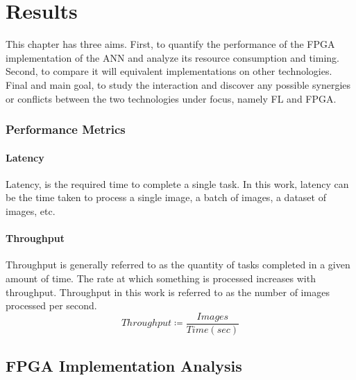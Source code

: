 \chapter{Results}
\label{Chapter-Results}
This chapter has three aims. First, to quantify the performance of the FPGA implementation of the ANN and analyze its resource consumption and timing. Second, to compare it will equivalent implementations on other technologies. Final and main goal, to study the interaction and discover any possible synergies or conflicts between the two technologies under focus, namely FL and FPGA. %

\subsection{Performance Metrics}

\subsubsection{Latency}
Latency, is the required time to complete a single task. In this work, latency can be the time taken to process a single image, a batch of images, a dataset of images, etc. %

\subsubsection{Throughput}
Throughput is generally referred to as the quantity of tasks completed in a given amount of time. The rate at which something is processed increases with throughput. Throughput in this work is referred to as the number of images processed per second. %
\begin{equation}
	Throughput \coloneqq \frac{Images}{Time (sec)}
	\label{eqn: Throughput definition}
\end{equation}

\section{FPGA Implementation Analysis}

